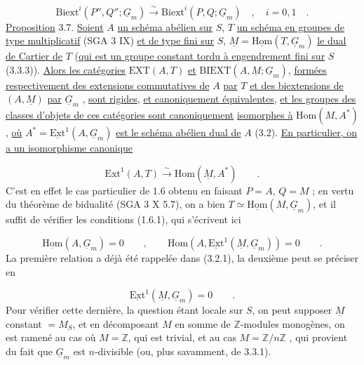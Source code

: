 \begin{equation}\tag{3.6.2}
\mathrm{Biext}^i(P'',Q'';\underline{G}_m) \stackrel{\sim}{\longrightarrow} \mathrm{Biext}^i(P,Q;\underline{G}_m) \quad , \quad i = 0, 1 \quad .
\end{equation}
\underline{Proposition} 3.7. \underline{Soient} $A$ \underline{un schéma abélien sur} $S$, $T$ \underline{un schéma en groupes de type multiplicatif} (SGA 3 IX) \underline{et de type fini sur} $S$, $\underline{M}=\underline{\mathrm{Hom}}(T,\underline{G}_m)$ \underline{le dual de Cartier de} $T$ (\underline{qui est un groupe constant tordu à engendrement fini sur} $S$ (3.3.3)). \underline{Alors les catégories} $\mathrm{EXT}(A,T)$ \underline{et} $\mathrm{BIEXT}(A,\underline{M}; \underline{G}_m)$, \underline{formées respectivement des extensions commutatives de} $A$ \underline{par} $T$ \underline{et des biextensions de} $(A,\underline{M})$ \underline{par} $\underline{G}_m$ , \underline{sont rigides}, \underline{et canoniquement équivalentes},
\underline{et les groupes des classes d'objets de ces catégories sont canoniquement} \underline{isomorphes à} $\mathrm{Hom}(M,A^*)$, \underline{où} $A^* = \underline{\mathrm{Ext}}^1(A,\underline{G}_m)$ \underline{est le schéma abélien dual de} $A$ (3.2). \underline{En particulier, on a un isomorphisme canonique}

\begin{equation}\tag{3.7.1}
\mathrm{Ext}^1(A,T) \stackrel{\sim}{\longrightarrow} \mathrm{Hom}(\underline{M},A^*) \qquad .
\end{equation}
C'est en effet le cas particulier de 1.6 obtenu en faisant $P = A$, $Q = M$ ; en vertu du théorème de bidualité (SGA 3 X 5.7), on a bien $T \simeq \underline{\mathrm{Hom}}(M,\underline{G}_m)$, et il suffit de vérifier les conditions (1.6.1), qui s'écrivent ici

\begin{equation*}
\underline{\mathrm{Hom}}(A,\underline{G}_m) = 0 \qquad , \qquad \mathrm{Hom}(A,\underline{\mathrm{Ext}}^1(\underline{M},\underline{G}_m)) = 0 \qquad .
\end{equation*}
La première relation a déjà été rappelée dans (3.2.1), la deuxième peut se préciser en

\begin{equation*}
\underline{\mathrm{Ext}}^1(\underline{M},\underline{G}_m) = 0 \qquad .
\end{equation*}
Pour vérifier cette dernière, la question étant locale sur $S$, on peut supposer $\underline{M}$ constant $= M_S$, et en décomposant $M$ en somme de $\mathbb{Z}$-modules monogènes, on est ramené au cas où $M = \mathbb{Z}$, qui est trivial, et au cas $M = \mathbb{Z}/n\mathbb{Z}$ , qui provient du fait que $\underline{G}_m$ est $n$-divisible (ou, plus savamment, de 3.3.1).

